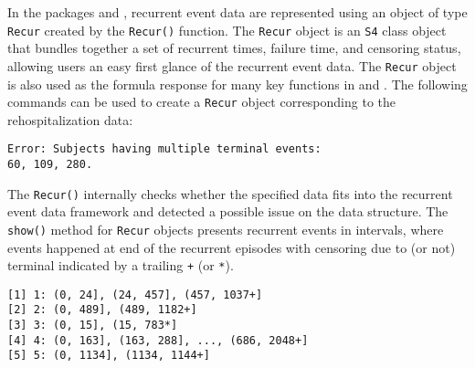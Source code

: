 In the packages  and , recurrent event data are
represented using an object of type \texttt{Recur} created by the
\texttt{Recur()} function. The \texttt{Recur} object is an \texttt{S4}
class object that bundles together a set of recurrent times, failure
time, and censoring status, allowing users an easy first glance of the
recurrent event data. The \texttt{Recur} object is also used as the
formula response for many key functions in  and .
The following commands can be used to create a \texttt{Recur} object
corresponding to the rehospitalization data:

\begin{Shaded}
\begin{Highlighting}[]
 \NormalTok{)}
\end{Highlighting}
\end{Shaded}

\begin{verbatim}
Error: Subjects having multiple terminal events:
60, 109, 280.
\end{verbatim}

The \texttt{Recur()} internally checks whether the specified data fits
into the recurrent event data framework and detected a possible issue on
the data structure. The \texttt{show()} method for \texttt{Recur}
objects presents recurrent events in intervals, where events happened at
end of the recurrent episodes with censoring due to (or not) terminal
indicated by a trailing \texttt{+} (or \texttt{*}).

\begin{Shaded}
\begin{Highlighting}[]
\StringTok{ }\StringTok{ }\OperatorTok{:}\NormalTok{)}
\end{Highlighting}
\end{Shaded}

\begin{verbatim}
[1] 1: (0, 24], (24, 457], (457, 1037+]       
[2] 2: (0, 489], (489, 1182+]                 
[3] 3: (0, 15], (15, 783*]                    
[4] 4: (0, 163], (163, 288], ..., (686, 2048+]
[5] 5: (0, 1134], (1134, 1144+]               
\end{verbatim}
